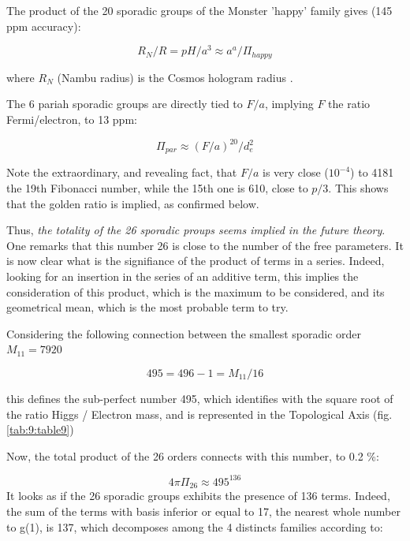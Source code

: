 \documentclass[a4paper,9pt]{article}
\begin{document}
The product of the 20 sporadic groups of the Monster 'happy' family gives (145 ppm accuracy):

\begin{equation}
 R_N/R = pH/a^3 \approx a^a /\Pi_{happy}
\end{equation}

where $R_N$ (Nambu radius) is the Cosmos hologram radius \cite {Sanchez}. 

The 6 pariah sporadic groups are directly tied to $F/a$, implying $F$ the ratio Fermi/electron, to 13 ppm:

\begin{equation}
\Pi_{par} \approx (F/a)^{20}/d_e^2
\end{equation}

Note the extraordinary, and revealing fact, that $F/a$ is very close ($10^{-4}$) to 4181 the 19th Fibonacci number, while the 15th one is 610, close to $p/3$. This shows that the golden ratio is implied, as confirmed below.
 

Thus, \textit{the totality of the 26 sporadic proups seems implied in the future theory}. One remarks that this number 26 is close to the number of the free parameters. It is now clear what is the signifiance of the product of terms in a series. Indeed, looking for an insertion in the series of an additive term, this implies the consideration of this product, which is the maximum to be considered, and its geometrical mean, which is the most probable term to try.

Considering the following connection between the smallest sporadic order $ M_{11} = 7920$

\begin{equation}
495 = 496 -1 = M_{11}/16
\end{equation}

this defines the sub-perfect number 495, which identifies with the square root of the ratio Higgs / Electron mass, and is represented in the Topological Axis (fig. \ref{tab:9:table9})

Now, the total product of the 26 orders connects with this number, to 0.2 \%:

\begin{equation}
4\pi \Pi_{26} \approx 495^{136}
\end{equation}
It looks as if the 26 sporadic groups exhibits the presence of 136 terms. Indeed, the sum of the terms with basis inferior or equal to 17, the nearest whole number to g(1), is 137, which decomposes among the 4 distincts families according to:
\end{document}

